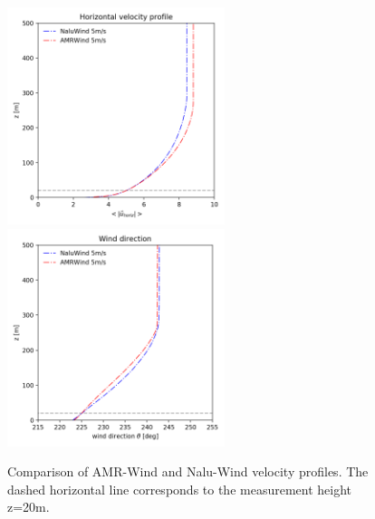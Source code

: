 \begin{figure} %
  \centering
  \includegraphics[width=2.5in]{figures/Compare_AMRWind_NaluWind/AMRWind_NaluWind_stable_05ms_mesh2p5_2p5_2p5_WS.png}
  \includegraphics[width=2.5in]{figures/Compare_AMRWind_NaluWind/AMRWind_NaluWind_stable_05ms_mesh2p5_2p5_2p5_Wdir.png}\\
  \caption{\label{fig:CompareAMRvsNaluWind_WSDir} Comparison of
    AMR-Wind and Nalu-Wind velocity profiles.  The dashed horizontal
    line corresponds to the measurement height z=20m. }
\end{figure}

